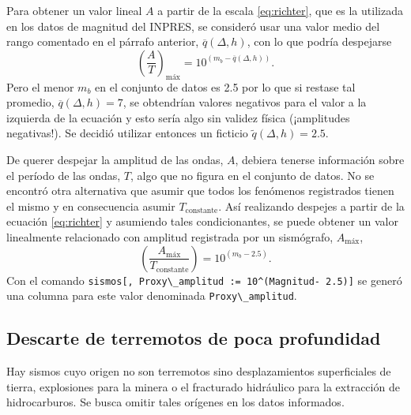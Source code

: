 \documentclass[a4paper]{report}
\begin{document}
Para obtener un valor lineal \(A\) a partir de la escala \ref{eq:richter}, que es la utilizada en los datos de magnitud del INPRES, se consideró usar una valor medio del rango comentado en el párrafo anterior, \(\overline{q}(\Delta,h)\), con lo que podría despejarse
\begin{equation}
	\left( \frac{A}{T} \right)_\text{máx} = 10^{(m_b - \overline{q}(\Delta,h) )}.
	\label{eq:linealizacionMagnitud}
\end{equation}
Pero el menor \(m_b\) en el conjunto de datos es \num{2.5} por lo que si restase tal promedio, \(\overline{q}(\Delta,h) = 7\), se obtendrían valores negativos para el valor a la izquierda de la ecuación y esto sería algo sin validez física (¡amplitudes negativas!).
Se decidió utilizar entonces un ficticio \(\tilde{q}(\Delta,h) = \num{2.5}\).  

De querer despejar la amplitud de las ondas, \(A\), debiera tenerse información sobre el período de las ondas, \(T\), algo que no figura en el conjunto de datos.
No se encontró otra alternativa que asumir que todos los fenómenos registrados tienen el mismo y en consecuencia asumir \(T_\text{constante}\).
Así realizando despejes a partir de la ecuación \ref{eq:richter} y asumiendo tales condicionantes, se puede obtener un valor linealmente relacionado con amplitud registrada por un sismógrafo, \(A_\text{máx}\),
\begin{equation}
	\left( \frac{A_\text{máx}}{T_\text{constante}} \right) = 10^{(m_b - 2.5)}.
	\label{eq:linealizacionMagnitud_final} 
\end{equation}
Con el comando \verb'sismos[, Proxy\_amplitud := 10^(Magnitud- 2.5)]' se generó una columna para este valor denominada \verb'Proxy\_amplitud'.



\subsection{Descarte de terremotos de poca profundidad}

Hay sismos cuyo origen no son terremotos sino desplazamientos superficiales de tierra, explosiones para la minera o el fracturado hidráulico para la extracción de hidrocarburos.
Se busca omitir tales orígenes en los datos informados.
\end{document}
